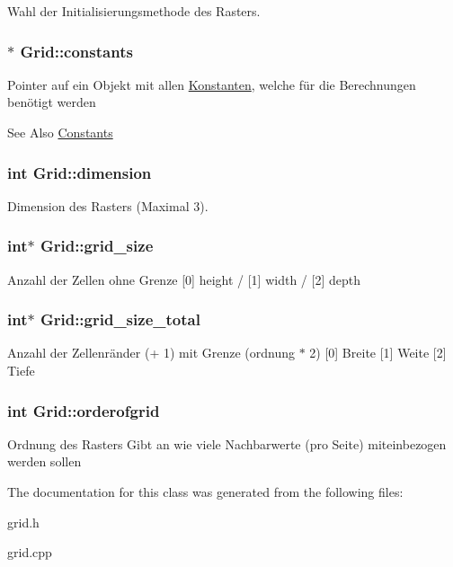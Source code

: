 Wahl der Initialisierungsmethode des Rasters. \hypertarget{classGrid_a9e529cbb3ec0b42c8b232be05923a030}{
\subsubsection[{constants}]{$\ast$ Grid\-::constants}}\label{classGrid_a9e529cbb3ec0b42c8b232be05923a030}
Pointer auf ein Objekt mit allen \hyperlink{classKonstanten}{Konstanten}, welche für die Berechnungen benötigt werden \begin{DoxySeeAlso}{See Also}
\hyperlink{classConstants}{Constants} 
\end{DoxySeeAlso}
\hypertarget{classGrid_a6970f8edab2f84c576fc335f6d023f95}{
\subsubsection[{dimension}]{\setlength{\rightskip}{0pt plus 5cm}int Grid\-::dimension}}\label{classGrid_a6970f8edab2f84c576fc335f6d023f95}
Dimension des Rasters (Maximal 3). \hypertarget{classGrid_a7b4eea4e828ebda3ebdfe78b2f9a14d2}{
\subsubsection[{grid\-\_\-size}]{\setlength{\rightskip}{0pt plus 5cm}int$\ast$ Grid\-::grid\-\_\-size}}\label{classGrid_a7b4eea4e828ebda3ebdfe78b2f9a14d2}
Anzahl der Zellen ohne Grenze \mbox{[}0\mbox{]} height / \mbox{[}1\mbox{]} width / \mbox{[}2\mbox{]} depth \hypertarget{classGrid_adbf3823ea45f6e5ae9210d44fbc7e79a}{
\subsubsection[{grid\-\_\-size\-\_\-total}]{\setlength{\rightskip}{0pt plus 5cm}int$\ast$ Grid\-::grid\-\_\-size\-\_\-total}}\label{classGrid_adbf3823ea45f6e5ae9210d44fbc7e79a}
Anzahl der Zellenränder (+ 1) mit Grenze (ordnung $\ast$ 2) \mbox{[}0\mbox{]} Breite \mbox{[}1\mbox{]} Weite \mbox{[}2\mbox{]} Tiefe \hypertarget{classGrid_a599c5aadae9322d115d974cb395a83bf}{
\subsubsection[{orderofgrid}]{\setlength{\rightskip}{0pt plus 5cm}int Grid\-::orderofgrid}}\label{classGrid_a599c5aadae9322d115d974cb395a83bf}
Ordnung des Rasters Gibt an wie viele Nachbarwerte (pro Seite) miteinbezogen werden sollen 

The documentation for this class was generated from the following files\-:\begin{DoxyCompactItemize}
\item 
grid.\-h\item 
grid.\-cpp\end{DoxyCompactItemize}
